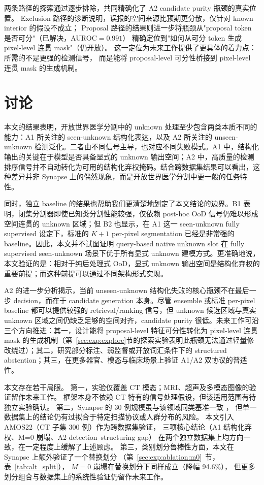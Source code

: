 \documentclass[3p,twocolumn,authoryear]{elsarticle}
\begin{document}
两条路径的探索通过逐步排除，共同精确化了 A2 candidate purity 瓶颈的真实位置。
Exclusion 路径的诊断说明，误报的空间来源比预期更分散，仅针对 known interior 的假设不成立；
Proposal 路径的结果则进一步将瓶颈从"proposal token 是否可分"（已解决，AUROC$=0.991$）
精确定位到"如何从可分 token 生成 pixel-level 连贯 mask"（仍开放）。
这一定位为未来工作提供了更具体的着力点：所需的不是更强的检测信号，
而是能将 proposal-level 可分性桥接到 pixel-level 连贯 mask 的生成机制。


\section{讨论}\label{sec:discussion}
本文的结果表明，开放世界医学分割中的 unknown 处理至少包含两类本质不同的能力：A1 所关注的 seen-unknown 结构化表达，以及 A2 所关注的 unseen-unknown 检测泛化。二者由不同信号主导，也对应不同失败模式。A1 中，结构化输出的关键在于模型是否具备显式的 unknown 输出空间；A2 中，高质量的检测排序信号并不自动转化为可用的结构化弃权掩码。结合跨数据集结果可以看出，这种差异并非 Synapse 上的偶然现象，而是开放世界医学分割中更一般的任务特性。

同时，独立 baseline 的结果也帮助我们更清楚地划定了本文结论的边界。B1 表明，闭集分割器即使已知类分割性能较强，仅依赖 post-hoc OoD 信号仍难以形成空间连贯的 unknown 区域；但 B2 也显示，在 A1 这一 seen-unknown fully supervised 设定下，标准的 $K+1$ per-pixel segmentation 已经是非常强的 baseline。因此，本文并不试图证明 query-based native unknown slot 在 fully supervised seen-unknown 场景下优于所有显式 unknown 建模方式。更准确地说，本文验证的是：相对于纯后处理式 OoD，显式 unknown 输出空间是结构化弃权的重要前提；而这种前提可以通过不同架构形式实现。

A2 的进一步分析揭示，当前 unseen-unknown 结构化失败的核心瓶颈不在最后一步 decision，而在于 candidate generation 本身。尽管 ensemble 或标准 per-pixel baseline 都可以提供较强的 retrieval/ranking 信号，但 unknown 候选区域与真实 unknown 区域之间仍缺乏足够的空间对齐，candidate purity 很低。未来工作可沿三个方向推进：其一，设计能将 proposal-level 特征可分性转化为 pixel-level 连贯 mask 的生成机制（第~\ref{sec:exp:explore}节的探索实验表明此瓶颈无法通过轻量修改绕过）；其二，研究部分标注、弱监督或开放词汇条件下的 structured abstention；其三，在更多器官、模态与临床场景上验证 A1/A2 双协议的普适性。

本文存在若干局限。
第一，实验仅覆盖 CT 模态；MRI、超声及多模态图像的验证留作未来工作。
框架本身不依赖 CT 特有的信号处理假设，但该适用范围有待独立实验确认。
第二，Synapse 的 30 例规模虽与该领域同类基准一致
\cite{chen2021transunet,cao2022swinunet}，
但单一数据集上的结论仍有过拟合于特定扫描协议或人群分布的风险。
本文引入 AMOS22（CT 子集 300 例）作为跨数据集验证，
三项核心结论（A1 结构化弃权、M=0 崩塌、A2 detection--structuring gap）
在两个独立数据集上均方向一致，在一定程度上缓解了上述顾虑。
第三，类别划分鲁棒性方面，本文在 Synapse 上额外验证了一个替换划分
（第~\ref{sec:exp:ablation:m0}~节，表~\ref{tab:alt_split}），
$M=0$ 崩塌在替换划分下同样成立（降幅 94.6\%），
但更多划分组合与数据集上的系统性验证仍留作未来工作。
\end{document}
